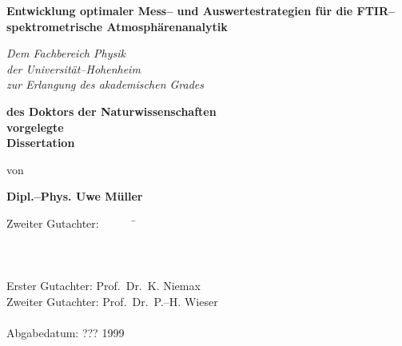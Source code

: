 \thispagestyle{empty}
\begin{center}

\LARGE \bf Entwicklung optimaler Mess-- und Auswertestrategien f\"{u}r
die FTIR--spektrometrische Atmosph\"{a}renanalytik \rm\\

\vspace{1.1cm}

\large\it Dem Fachbereich Physik\\ der Universit\"{a}t--Hohenheim\\
zur Erlangung des akademischen Grades\\ \vspace{1.1cm}

\LARGE \bf des Doktors der Naturwissenschaften\\

\vspace{1.1cm} \large \rm vorgelegte\\ \vspace{1.1cm} \LARGE \bf
Dissertation \rm\\

\vspace{1.1cm}

\large von\\

\vspace{1.1cm}

\LARGE \bf Dipl.--Phys. Uwe M\"{u}ller \rm\\

\vspace{0.6cm}
\end{center}
\vfill
\begin{tabbing}
\hspace{0.5cm}\large Zweiter Gutachter: \ \ \ \ \ \ \=  \kill \>\\
\>\\ \>\\ \>\\ \hspace{0.5cm}\large Erster Gutachter:\> \large
Prof.\ Dr.\ K. Niemax \\ \hspace{0.5cm}\large Zweiter Gutachter:\>
\large Prof.\ Dr.\ P.--H. Wieser\\ \>\\ \hspace{0.5cm}\large
Abgabedatum:\> \large ??? 1999\\
\end{tabbing}

\cleardoublepage
